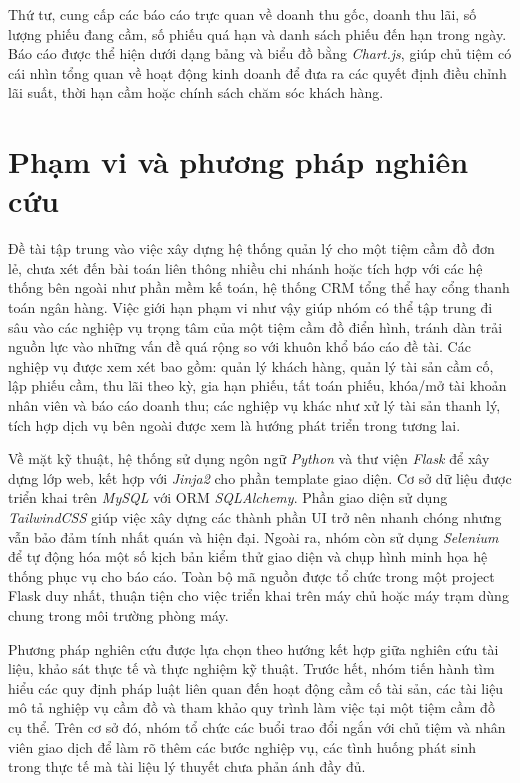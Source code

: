 \documentclass[13pt,a4paper]{extreport}
\begin{document}
Thứ tư, cung cấp các báo cáo trực quan về doanh thu gốc, doanh thu lãi, số lượng phiếu đang cầm, số phiếu quá hạn và danh sách phiếu đến hạn trong ngày. Báo cáo được thể hiện dưới dạng bảng và biểu đồ bằng \emph{Chart.js}, giúp chủ tiệm có cái nhìn tổng quan về hoạt động kinh doanh để đưa ra các quyết định điều chỉnh lãi suất, thời hạn cầm hoặc chính sách chăm sóc khách hàng.

\section{Phạm vi và phương pháp nghiên cứu}

Đề tài tập trung vào việc xây dựng hệ thống quản lý cho một tiệm cầm đồ đơn lẻ, chưa xét đến bài toán liên thông nhiều chi nhánh hoặc tích hợp với các hệ thống bên ngoài như phần mềm kế toán, hệ thống CRM tổng thể hay cổng thanh toán ngân hàng. Việc giới hạn phạm vi như vậy giúp nhóm có thể tập trung đi sâu vào các nghiệp vụ trọng tâm của một tiệm cầm đồ điển hình, tránh dàn trải nguồn lực vào những vấn đề quá rộng so với khuôn khổ báo cáo đề tài. Các nghiệp vụ được xem xét bao gồm: quản lý khách hàng, quản lý tài sản cầm cố, lập phiếu cầm, thu lãi theo kỳ, gia hạn phiếu, tất toán phiếu, khóa/mở tài khoản nhân viên và báo cáo doanh thu; các nghiệp vụ khác như xử lý tài sản thanh lý, tích hợp dịch vụ bên ngoài được xem là hướng phát triển trong tương lai.

Về mặt kỹ thuật, hệ thống sử dụng ngôn ngữ \emph{Python} và thư viện \emph{Flask} để xây dựng lớp web, kết hợp với \emph{Jinja2} cho phần template giao diện. Cơ sở dữ liệu được triển khai trên \emph{MySQL} với ORM \emph{SQLAlchemy}. Phần giao diện sử dụng \emph{TailwindCSS} giúp việc xây dựng các thành phần UI trở nên nhanh chóng nhưng vẫn bảo đảm tính nhất quán và hiện đại. Ngoài ra, nhóm còn sử dụng \emph{Selenium} để tự động hóa một số kịch bản kiểm thử giao diện và chụp hình minh họa hệ thống phục vụ cho báo cáo. Toàn bộ mã nguồn được tổ chức trong một project Flask duy nhất, thuận tiện cho việc triển khai trên máy chủ hoặc máy trạm dùng chung trong môi trường phòng máy.

Phương pháp nghiên cứu được lựa chọn theo hướng kết hợp giữa nghiên cứu tài liệu, khảo sát thực tế và thực nghiệm kỹ thuật. Trước hết, nhóm tiến hành tìm hiểu các quy định pháp luật liên quan đến hoạt động cầm cố tài sản, các tài liệu mô tả nghiệp vụ cầm đồ và tham khảo quy trình làm việc tại một tiệm cầm đồ cụ thể. Trên cơ sở đó, nhóm tổ chức các buổi trao đổi ngắn với chủ tiệm và nhân viên giao dịch để làm rõ thêm các bước nghiệp vụ, các tình huống phát sinh trong thực tế mà tài liệu lý thuyết chưa phản ánh đầy đủ.
\end{document}
